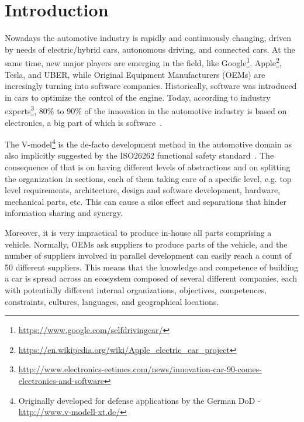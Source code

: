 \section{Introduction}\label{sec:intro}


Nowadays the automotive industry is rapidly and continuously changing, driven by needs of 
electric/hybrid cars, autonomous driving, and connected cars. At the same time, new major players are emerging in the field, like Google\footnote{\url{https://www.google.com/selfdrivingcar/}}, %
 Apple\footnote{\url{https://en.wikipedia.org/wiki/Apple_electric_car_project}}, %
 Tesla, and UBER, while Original Equipment Manufacturers (OEMs) are incresingly turning into software companies. 
Historically, software was introduced in cars to optimize the control of the engine. 
Today, according to industry experts\footnote{\url{http://www.electronics-eetimes.com/news/innovation-car-90-comes-electronics-and-software}}, 80\% to 90\% of the innovation in the automotive industry is based on electronics, a big part of which is software~\cite{ESEM2016}. 

The V-model\footnote{Originally developed for defense applications by the German DoD - \url{http://www.v-modell-xt.de/}} is the de-facto development method in the automotive domain as also implicitly suggested by the ISO26262 functional safety standard~\cite{iso26262}. The consequence of that is on having 
different levels of abstractions and on splitting the organization in sections, each of them taking care of a specific level, e.g. top level requirements,
architecture, design and software development, hardware, mechanical parts, etc. 
This can cause a silos effect and separations that hinder information sharing and synergy.

Moreover, it is very impractical to produce in-house all parts comprising a vehicle. Normally, OEMs 
ask suppliers to produce parts of the vehicle, and the number of suppliers involved in parallel development can easily reach a count of 50 different suppliers. 
This means that the knowledge and competence of building a car is spread across an ecosystem composed of several different companies, each with potentially different internal organizations, objectives, competences, constraints, cultures, languages, and geographical locations. 

